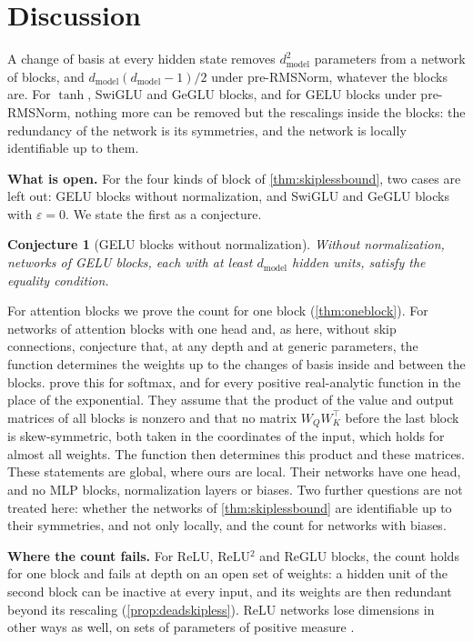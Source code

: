 \documentclass[10pt]{article}
\newtheorem{conjecture}{Conjecture}
\theoremstyle{definition}
\theoremstyle{remark}
\newcommand{\dm}{d_{\mathrm{model}}}
\newcommand{\para}[1]{\smallskip\noindent\textbf{#1}\hspace{0.5em}}
\begin{document}
\section{Discussion}\label{sec:conclusion}\label{sec:open}\label{sec:measured}

A change of basis at every hidden state removes $\dm^2$ parameters from a network of blocks, and $\dm(\dm-1)/2$ under pre-RMSNorm, whatever the blocks are. For $\tanh$, SwiGLU and GeGLU blocks, and for GELU blocks under pre-RMSNorm, nothing more can be removed but the rescalings inside the blocks: the redundancy of the network is its symmetries, and the network is locally identifiable up to them.

\para{What is open.} For the four kinds of block of \cref{thm:skiplessbound}, two cases are left out: GELU blocks without normalization, and SwiGLU and GeGLU blocks with $\varepsilon = 0$. We state the first as a conjecture.

\begin{conjecture}[GELU blocks without normalization]\label{conj:equality}
Without normalization, networks of GELU blocks, each with at least $\dm$ hidden units, satisfy the equality condition.
\end{conjecture}

For attention blocks we prove the count for one block (\cref{thm:oneblock}). For networks of attention blocks with one head and, as here, without skip connections, \citet{henry2025lightning} conjecture that, at any depth and at generic parameters, the function determines the weights up to the changes of basis inside and between the blocks. \citet{amarel2026identifiability} prove this for softmax, and \citet{konda2026identifiability} for every positive real-analytic function in the place of the exponential. They assume that the product of the value and output matrices of all blocks is nonzero and that no matrix $W_QW_K^\top$ before the last block is skew-symmetric, both taken in the coordinates of the input, which holds for almost all weights. The function then determines this product and these matrices. These statements are global, where ours are local. Their networks have one head, and no MLP blocks, normalization layers or biases. Two further questions are not treated here: whether the networks of \cref{thm:skiplessbound} are identifiable up to their symmetries, and not only locally, and the count for networks with biases.

\para{Where the count fails.} For ReLU, ReLU$^2$ and ReGLU blocks, the count holds for one block and fails at depth on an open set of weights: a hidden unit of the second block can be inactive at every input, and its weights are then redundant beyond its rescaling (\cref{prop:deadskipless}). ReLU networks lose dimensions in other ways as well, on sets of parameters of positive measure \citep{grigsby2023hidden}.
\end{document}
